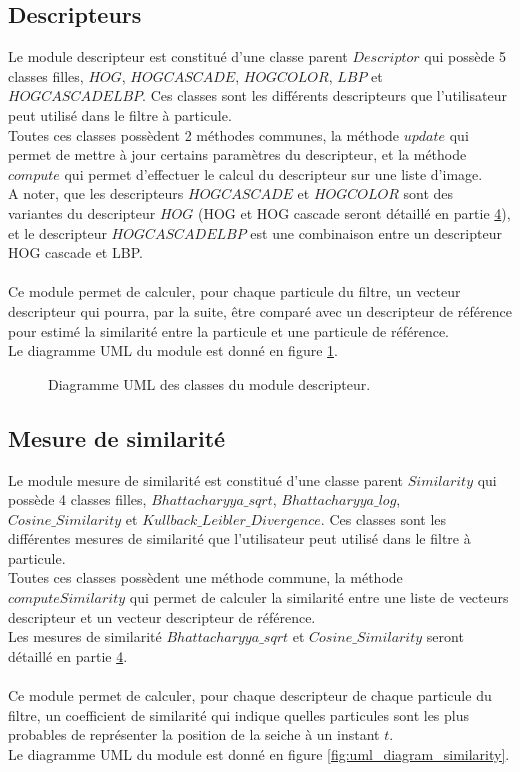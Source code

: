 \subsection{Descripteurs}
Le module descripteur est constitué d'une classe parent $Descriptor$ qui possède 5 classes filles, $HOG$, $HOGCASCADE$, $HOGCOLOR$, $LBP$ et $HOGCASCADELBP$. Ces classes sont les différents descripteurs que l'utilisateur peut utilisé dans le filtre à particule.\\
Toutes ces classes possèdent 2 méthodes communes, la méthode $update$ qui permet de mettre à jour certains paramètres du descripteur, et la méthode $compute$ qui permet d'effectuer le calcul du descripteur sur une liste d'image.\\
A noter, que les descripteurs $HOGCASCADE$ et $HOGCOLOR$ sont des variantes du descripteur $HOG$ (HOG et HOG cascade seront détaillé en partie \hyperlink{chapter.4}{4}), et le descripteur $HOGCASCADELBP$ est une combinaison entre un descripteur HOG cascade et LBP.\\
\\
Ce module permet de calculer, pour chaque particule du filtre, un vecteur descripteur qui pourra, par la suite, être comparé avec un descripteur de référence pour estimé la similarité entre la particule et une particule de référence.\\
Le diagramme UML du module est donné en figure \ref{fig:uml_diagram_descriptor}.

\begin{figure}[!htbp]
\center
\caption{Diagramme UML des classes du module descripteur.}
\label{fig:uml_diagram_descriptor}
\end{figure}
\FloatBarrier




\subsection{Mesure de similarité}
Le module mesure de similarité est constitué d'une classe parent $Similarity$ qui possède 4 classes filles, $Bhattacharyya\_sqrt$, $Bhattacharyya\_log$, $Cosine\_Similarity$ et $Kullback\_Leibler\_Divergence$. Ces classes sont les différentes mesures de similarité que l'utilisateur peut utilisé dans le filtre à particule.\\
Toutes ces classes possèdent une méthode commune, la méthode $computeSimilarity$ qui permet de calculer la similarité entre une liste de vecteurs descripteur et un vecteur descripteur de référence.\\
Les mesures de similarité $Bhattacharyya\_sqrt$ et $Cosine\_Similarity$ seront détaillé en partie \hyperlink{chapter.4}{4}.\\
\\
Ce module permet de calculer, pour chaque descripteur de chaque particule du filtre, un coefficient de similarité qui indique quelles particules sont les plus probables de représenter la position de la seiche à un instant $t$.\\
Le diagramme UML du module est donné en figure \ref{fig:uml_diagram_similarity}.

